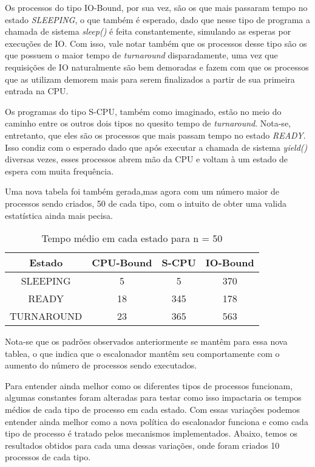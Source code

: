 \documentclass{article}
\begin{document}
Os processos do tipo IO-Bound, por sua vez, são os que mais passaram tempo no
estado \textit{SLEEPING}, o que também é esperado, dado que nesse tipo de
programa a chamada de sistema \textit{sleep()} é feita constantemente,
simulando as esperas por execuções de IO. Com isso, vale notar também que os
processos desse tipo são os que possuem o maior tempo de \textit{turnaround}
disparadamente, uma vez que requisições de IO naturalmente são bem demoradas e
fazem com que os processos que as utilizam demorem mais para serem finalizados
a partir de sua primeira entrada na CPU.

Os programas do tipo S-CPU, também como imaginado, estão no meio do caminho
entre os outros dois tipos no quesito tempo de \textit{turnaround}. Nota-se,
entretanto, que eles são os processos que mais passam tempo no estado
\textit{READY}. Isso condiz com o esperado dado que após executar a chamada de
sistema \textit{yield()} diversas vezes, esses processos abrem mão da CPU e
voltam à um estado de espera com muita frequência.

Uma nova tabela foi também gerada,mas agora com um número maior de processos
sendo criados, 50 de cada tipo, com o intuito de obter uma valida estatística
ainda mais pecisa.

\begin{table}[H]
      \centering
      \begin{tabular}{|c|c|c|c|}
            \hline
            Estado     & CPU-Bound & S-CPU &
            IO-Bound                             \\
            \hline
            SLEEPING   & 5         & 5     & 370 \\
            READY      & 18        & 345   & 178 \\
            TURNAROUND & 23        & 365   & 563 \\
            \hline
      \end{tabular}
      \caption{Tempo médio em cada estado para n = 50}
\end{table}

Nota-se que os padrões observados anteriormente se mantêm para essa nova
tablea, o que indica que o escalonador mantêm seu comportamente com o aumento
do número de processos sendo executados.

Para entender ainda melhor como os diferentes tipos de processos funcionam,
algumas constantes foram alteradas para testar como isso impactaria os tempos
médios de cada tipo de processo em cada estado. Com essas variações podemos
entender ainda melhor como a nova política do escalonador funciona e como cada
tipo de processo é tratado pelos mecanismos implementados. Abaixo, temos os
resultados obtidos para cada uma dessas variações, onde foram criados 10
processos de cada tipo.
\end{document}
